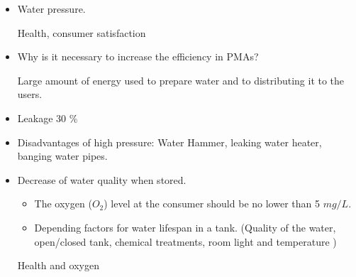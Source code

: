  
\begin{itemize}
\item Water pressure. 

Health, consumer satisfaction
\item Why is it necessary to increase the efficiency in PMAs?

Large amount of energy used to prepare water and to distributing it to the users. 
\item Leakage 30 \%
\item Disadvantages of high pressure: Water Hammer, leaking water heater, banging 
water pipes. %
\item Decrease of water quality when stored. 
\begin{itemize}
\item The oxygen ($O_2$) level at the consumer should be no lower than 5 $mg/L$. 
\item Depending factors for water lifespan in a tank. (Quality of the water, open/closed tank, chemical treatments, room light and temperature )  %
\end{itemize}
Health and oxygen 
\end{itemize}



